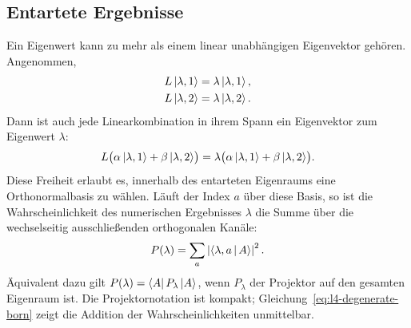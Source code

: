\begin{classroomqa}\end{classroomqa}

\begin{classroomqa}\end{classroomqa}

\subsection{Entartete Ergebnisse}

Ein Eigenwert kann zu mehr als einem linear unabhängigen Eigenvektor gehören. Angenommen,
\begin{align}
L\left\lvert\lambda,1\right\rangle&=\lambda\left\lvert\lambda,1\right\rangle,\\
L\left\lvert\lambda,2\right\rangle&=\lambda\left\lvert\lambda,2\right\rangle.
\end{align}
Dann ist auch jede Linearkombination in ihrem Spann ein Eigenvektor zum Eigenwert \(\lambda\):
\begin{equation}
L\bigl(\alpha\left\lvert\lambda,1\right\rangle+\beta\left\lvert\lambda,2\right\rangle\bigr)
=
\lambda\bigl(\alpha\left\lvert\lambda,1\right\rangle+\beta\left\lvert\lambda,2\right\rangle\bigr).
\end{equation}
Diese Freiheit erlaubt es, innerhalb des entarteten Eigenraums eine Orthonormalbasis zu wählen. Läuft der Index \(a\) über diese Basis, so ist die Wahrscheinlichkeit des numerischen Ergebnisses \(\lambda\) die Summe über die wechselseitig ausschließenden orthogonalen Kanäle:
\begin{equation}
P(\lambda)=\sum_a\left|\left\langle\lambda,a\,\middle|\,A\right\rangle\right|^2.
\label{eq:l4-degenerate-born}
\end{equation}
Äquivalent dazu gilt \(P(\lambda)=\left\langle A\right\rvert P_\lambda\left\lvert A\right\rangle\), wenn \(P_\lambda\) der Projektor auf den gesamten Eigenraum ist. Die Projektornotation ist kompakt; Gleichung~\eqref{eq:l4-degenerate-born} zeigt die Addition der Wahrscheinlichkeiten unmittelbar.

